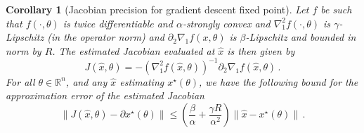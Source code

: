 \documentclass{article}
\def\RR{{\mathbb R}}
\newtheorem{corollary}{Corollary}
\begin{document}
\begin{corollary}[Jacobian precision for gradient descent fixed point]
\label{cor:precision-gd}
    Let $f$ be such that $f(\cdot, \theta)$ is twice differentiable and
    $\alpha$-strongly convex and $\nabla_1^2f(\cdot, \theta)$ is
    $\gamma$-Lipschitz (in the operator norm) and $\partial_2\nabla_1 f(x, \theta)$ is $\beta$-Lipschitz and bounded in norm by $R$. The estimated Jacobian evaluated at $\hat x$ is then given by 
 \[   
 J(\hat x, \theta) = - (\nabla^2_1f(\hat x, \theta))^{-1} \partial_2\nabla_{1} f(\hat x, \theta)\, .
 \]
 For all $\theta \in \RR^n$, and any $\hat{x}$ estimating $x^\star(\theta)$, we have the following bound for the approximation error of the estimated Jacobian
\[
\|J(\hat x, \theta) - \partial x^\star (\theta)\| \le \left(\frac{\beta}{\alpha} + \frac{\gamma R}{\alpha^2}\right) \|\hat x - x^\star(\theta)\|\, .
\]
\end{corollary}
\end{document}
